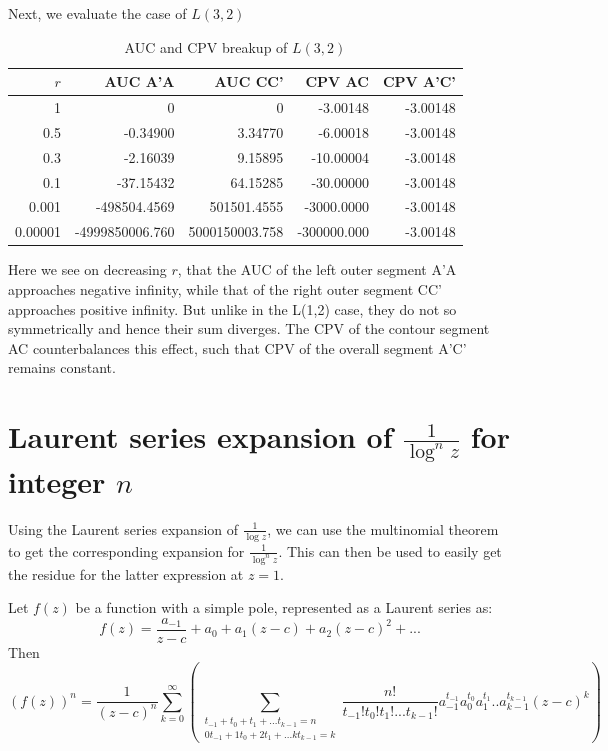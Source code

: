 \documentclass[a4paper,11pt,twoside]{amsart}
\begin{document}
Next, we evaluate the case of $L(3,2)$
\begin{table}[H]
  \begin{center}
    \begin{tabular}{r|r|r|r|r} %
      $r$ & AUC A'A & AUC CC' & CPV AC & CPV A'C'\\
      \hline
      1 & 0 & 0 & -3.00148 & -3.00148\\
      0.5 & -0.34900 & 3.34770 & -6.00018 & -3.00148\\
      0.3 & -2.16039 & 9.15895 & -10.00004 & -3.00148\\
      0.1 & -37.15432 & 64.15285 & -30.00000 & -3.00148\\
      0.001 & -498504.4569 & 501501.4555 & -3000.0000 & -3.00148\\
      0.00001 & -4999850006.760 & 5000150003.758 & -300000.000 & -3.00148\\
    \end{tabular}
    \caption{AUC and CPV breakup of $L(3,2)$}
  \end{center}
\end{table}
\vspace{-2em}
Here we see on decreasing $r$, that the AUC of the left outer segment A'A approaches negative infinity, while that of the right outer segment CC' approaches positive infinity. But unlike in the L(1,2) case, they do not so symmetrically and hence their sum diverges. The CPV of the contour segment AC counterbalances this effect, such that CPV of the overall segment A'C' remains constant. 

\section{Laurent series expansion of $\frac{1}{\log^n z}$ for integer $n$}

Using the Laurent series expansion of $\frac{1}{\log z}$, we can use the multinomial theorem to get the corresponding expansion for $\frac{1}{\log^{n} z}$. This can then be used to easily get the residue for the latter expression at $z=1$.

Let $f(z)$ be a function with a simple pole, represented as a Laurent series as: $$f(z) = \frac{a_{-1}}{z-c} + a_0 + a_1 (z-c) + a_2 (z-c)^2 + ...$$
Then $$(f(z))^n = \frac{1}{(z-c)^n} \sum\limits_{k=0}^{\infty}(\sum\limits_{\substack{t_{-1} + t_0 + t_1 + ... t_{k-1} = n \\ 0t_{-1} + 1t_0 + 2t_1 + ... kt_{k-1} = k}} \frac{n!}{t_{-1}!t_{0}!t_{1}!...t_{k-1}!} a_{-1}^{t_{-1}} a_{0}^{t_0}a_{1}^{t_1}..a_{k-1}^{t_{k-1}} (z-c)^k)$$
\end{document}
